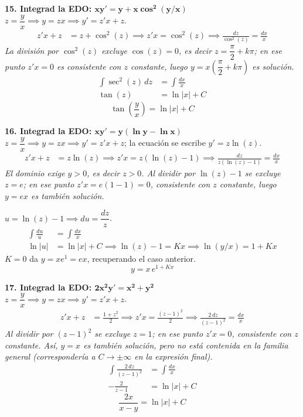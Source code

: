 \documentclass[11pt, a4paper]{article}
\begin{document}
\noindent\textbf{15. Integrad la EDO: $\bm{xy' = y + x\cos^2(y/x)}$} \\
$z = \dfrac{y}{x} \implies y = zx \implies y' = z'x+z$.
\begin{align*}
z'x + z &= z + \cos^2(z) \implies z'x = \cos^2(z) \implies \frac{dz}{\cos^2(z)} = \frac{dx}{x}
\end{align*}
\textit{La división por $\cos^2(z)$ excluye $\cos(z)=0$, es decir $z=\dfrac{\pi}{2}+k\pi$; en ese punto $z'x=0$ es consistente con $z$ constante, luego $y=x\left(\dfrac{\pi}{2}+k\pi\right)$ es solución.}
\begin{align*}
\int \sec^2(z)\,dz &= \int \frac{dx}{x} \\
\tan(z) &= \ln|x| + C
\end{align*}
\[
\boxed{\tan\left(\frac{y}{x}\right) = \ln|x| + C}
\]


\noindent\textbf{16. Integrad la EDO: $\bm{xy' = y(\ln y - \ln x)}$} \\
$z = \dfrac{y}{x} \implies y = zx \implies y' = z'x+z$; la ecuación se escribe $y' = z\ln(z)$.
\begin{align*}
z'x + z &= z\ln(z) \implies z'x = z(\ln(z)-1) \implies \frac{dz}{z(\ln(z)-1)} = \frac{dx}{x}
\end{align*}
\textit{El dominio exige $y>0$, es decir $z>0$. Al dividir por $\ln(z)-1$ se excluye $z=e$; en ese punto $z'x=e(1-1)=0$, consistente con $z$ constante, luego $y=ex$ es también solución.}

$u = \ln(z)-1 \implies du = \dfrac{dz}{z}$.
\begin{align*}
\int \frac{du}{u} &= \int \frac{dx}{x} \\
\ln|u| &= \ln|x| + C \implies \ln(z)-1 = Kx \implies \ln(y/x) = 1 + Kx
\end{align*}
$K=0$ da $y=xe^1=ex$, recuperando el caso anterior.
\[
\boxed{y = x\, e^{1+Kx}}
\]


\noindent\textbf{17. Integrad la EDO: $\bm{2x^2y' = x^2+y^2}$} \\
$z = \dfrac{y}{x} \implies y = zx \implies y' = z'x+z$.
\begin{align*}
z'x + z &= \frac{1+z^2}{2} \implies z'x = \frac{(z-1)^2}{2} \implies \frac{2\,dz}{(z-1)^2} = \frac{dx}{x}
\end{align*}
\textit{Al dividir por $(z-1)^2$ se excluye $z=1$; en ese punto $z'x=0$, consistente con $z$ constante. Así, $y=x$ es también solución, pero \emph{no} está contenida en la familia general (correspondería a $C\to\pm\infty$ en la expresión final).}
\begin{align*}
\int \frac{2\,dz}{(z-1)^2} &= \int \frac{dx}{x} \\
-\frac{2}{z-1} &= \ln|x| + C
\end{align*}
\[
\boxed{\frac{2x}{x-y} = \ln|x| + C}
\]
\end{document}
